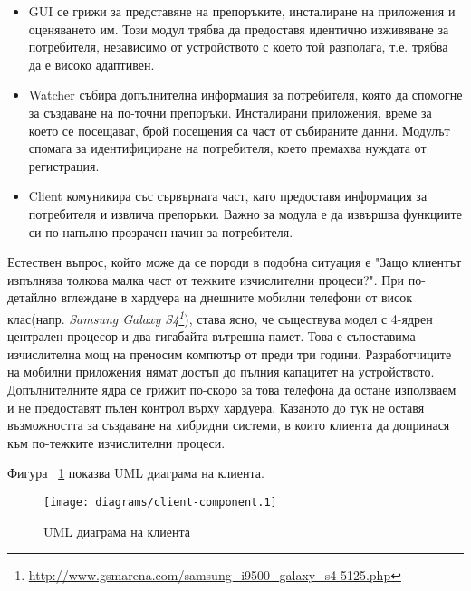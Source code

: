 \begin{itemize}
		\begin{itemize}
			\item GUI се грижи за представяне на препоръките, инсталиране на приложения и оценяването им. Този модул трябва да предоставя идентично изживяване за потребителя, независимо от устройството с което той разполага, т.е. трябва да е високо адаптивен.
			\item Watcher събира допълнителна информация за потребителя, която да спомогне за създаване на по-точни препоръки. Инсталирани приложения, време за което се посещават, брой посещения са част от събираните данни. Модулът спомага за идентифициране на потребителя, което премахва нуждата от регистрация.
			\item Client комуникира със сървърната част, като предоставя информация за потребителя и извлича препоръки. Важно за модула е да извършва функциите си по напълно прозрачен начин за потребителя.

		\end{itemize}
		
		Естествен въпрос, който може да се породи в подобна ситуация е "Защо клиентът изпълнява толкова малка част от тежките изчислителни процеси?".
		При по-детайлно вглеждане в хардуера на днешните мобилни телефони от висок клас(напр. \emph{Samsung Galaxy S4\footnote{\url{http://www.gsmarena.com/samsung_i9500_galaxy_s4-5125.php}}}), става ясно, че съществува модел с 4-ядрен централен процесор и два гигабайта вътрешна памет. Това е съпоставима изчислителна мощ на преносим компютър от преди три години. Разработчиците на мобилни приложения нямат достъп до пълния капацитет на устройството. Допълнителните ядра се грижит по-скоро за това телефона да остане използваем и не предоставят пълен контрол върху хардуера\cite{Gupta}.
		Казаното до тук не оставя възможността за създаване на хибридни системи, в които клиента да допринася към по-тежките изчислителни процеси.
		
		Фигура ~\ref{figure:client-component} показва UML диаграма на клиента.
		
		\begin{figure}[htbp]
			\centering	
 			\texttt{[image: diagrams/client-component.1]}
			\caption{UML диаграма на клиента}
			\label{figure:client-component}
		\end{figure}
	\end{itemize}
	
	